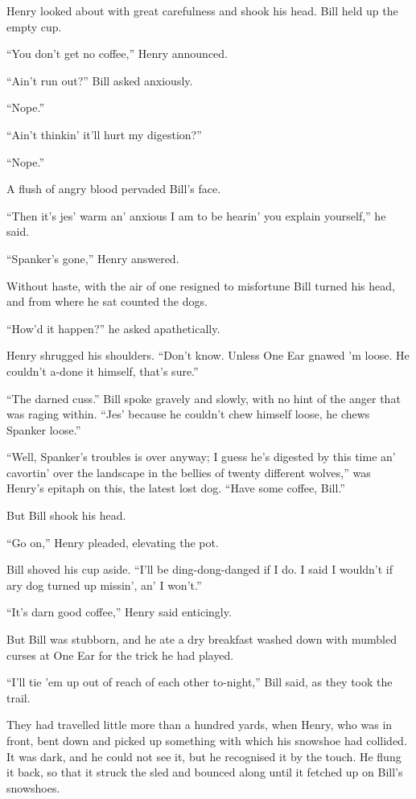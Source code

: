 Henry looked about with great carefulness and shook his head. Bill held
up the empty cup.

“You don’t get no coffee,” Henry announced.

“Ain’t run out?” Bill asked anxiously.

“Nope.”

“Ain’t thinkin’ it’ll hurt my digestion?”

“Nope.”

A flush of angry blood pervaded Bill’s face.

“Then it’s jes’ warm an’ anxious I am to be hearin’ you explain
yourself,” he said.

“Spanker’s gone,” Henry answered.

Without haste, with the air of one resigned to misfortune Bill turned
his head, and from where he sat counted the dogs.

“How’d it happen?” he asked apathetically.

Henry shrugged his shoulders. “Don’t know. Unless One Ear gnawed ’m
loose. He couldn’t a-done it himself, that’s sure.”

“The darned cuss.” Bill spoke gravely and slowly, with no hint of the
anger that was raging within. “Jes’ because he couldn’t chew himself
loose, he chews Spanker loose.”

“Well, Spanker’s troubles is over anyway; I guess he’s digested by this
time an’ cavortin’ over the landscape in the bellies of twenty
different wolves,” was Henry’s epitaph on this, the latest lost dog.
“Have some coffee, Bill.”

But Bill shook his head.

“Go on,” Henry pleaded, elevating the pot.

Bill shoved his cup aside. “I’ll be ding-dong-danged if I do. I said I
wouldn’t if ary dog turned up missin’, an’ I won’t.”

“It’s darn good coffee,” Henry said enticingly.

But Bill was stubborn, and he ate a dry breakfast washed down with
mumbled curses at One Ear for the trick he had played.

“I’ll tie ’em up out of reach of each other to-night,” Bill said, as
they took the trail.

They had travelled little more than a hundred yards, when Henry, who
was in front, bent down and picked up something with which his snowshoe
had collided. It was dark, and he could not see it, but he recognised
it by the touch. He flung it back, so that it struck the sled and
bounced along until it fetched up on Bill’s snowshoes.


